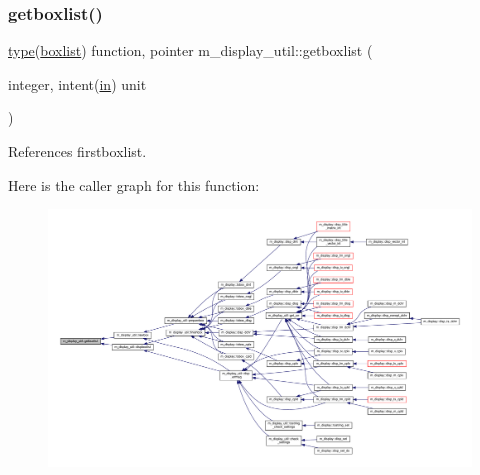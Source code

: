 \subsubsection{\texorpdfstring{getboxlist()}{getboxlist()}}
{\footnotesize\ttfamily \hyperlink{stop__watch_83_8txt_a70f0ead91c32e25323c03265aa302c1c}{type}(\hyperlink{structm__display__util_1_1boxlist}{boxlist}) function, pointer m\+\_\+display\+\_\+util\+::getboxlist (\begin{DoxyParamCaption}\item[{integer, intent(\hyperlink{M__journal_83_8txt_afce72651d1eed785a2132bee863b2f38}{in})}]{unit }\end{DoxyParamCaption})\hspace{0.3cm}{\ttfamily [private]}}



References firstboxlist.

Here is the caller graph for this function\+:
\nopagebreak
\begin{figure}[H]
\begin{center}
\leavevmode
\includegraphics[width=350pt]{namespacem__display__util_a093be898cc19ed648b45e728b72d4f5f_icgraph}
\end{center}
\end{figure}
\mbox{\label{namespacem__display__util_a692b7279b1883d8139b60e480aa1e430}} 

